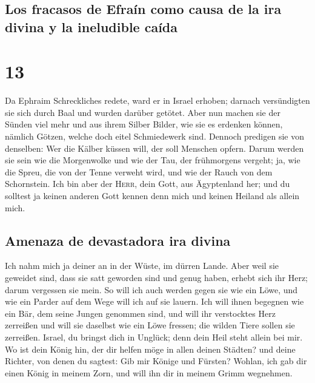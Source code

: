 \hypertarget{los-fracasos-de-efrauxedn-como-causa-de-la-ira-divina-y-la-ineludible-cauxedda}{%
\subsection{Los fracasos de Efraín como causa de la ira divina y la
ineludible
caída}\label{los-fracasos-de-efrauxedn-como-causa-de-la-ira-divina-y-la-ineludible-cauxedda}}

\hypertarget{section-12}{%
\section{13}\label{section-12}}

 Da Ephraim Schreckliches redete, ward er in Israel
erhoben; darnach versündigten sie sich durch Baal und wurden darüber
getötet.  Aber nun machen sie der Sünden viel mehr und aus
ihrem Silber Bilder, wie sie es erdenken können, nämlich Götzen, welche
doch eitel Schmiedewerk sind. Dennoch predigen sie von denselben: Wer
die Kälber küssen will, der soll Menschen opfern.  Darum
werden sie sein wie die Morgenwolke und wie der Tau, der frühmorgens
vergeht; ja, wie die Spreu, die von der Tenne verweht wird, und wie der
Rauch von dem Schornstein.  Ich bin aber der
\textsc{Herr}, dein Gott, aus Ägyptenland her; und du solltest ja keinen
anderen Gott kennen denn mich und keinen Heiland als allein mich.

\hypertarget{amenaza-de-devastadora-ira-divina}{%
\subsection{Amenaza de devastadora ira
divina}\label{amenaza-de-devastadora-ira-divina}}

 Ich nahm mich ja deiner an in der Wüste, im dürren Lande.
 Aber weil sie geweidet sind, dass sie satt geworden sind
und genug haben, erhebt sich ihr Herz; darum vergessen sie mein.
 So will ich auch werden gegen sie wie ein Löwe, und wie
ein Parder auf dem Wege will ich auf sie lauern.  Ich will
ihnen begegnen wie ein Bär, dem seine Jungen genommen sind, und will ihr
verstocktes Herz zerreißen und will sie daselbst wie ein Löwe fressen;
die wilden Tiere sollen sie zerreißen.  Israel, du bringst
dich in Unglück; denn dein Heil steht allein bei mir.  Wo
ist dein König hin, der dir helfen möge in allen deinen Städten? und
deine Richter, von denen du sagtest: Gib mir Könige und Fürsten?
 Wohlan, ich gab dir einen König in meinem Zorn, und will
ihn dir in meinem Grimm wegnehmen.

